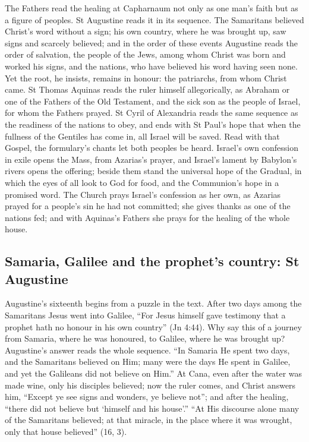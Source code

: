 \label{sec:israel-and-the-nations}

The Fathers read the healing at Capharnaum not only as one man's faith but as
a figure of peoples. St Augustine reads it in its sequence. The Samaritans
believed Christ's word without a sign; his own country, where he was brought up,
saw signs and scarcely believed; and in the order of these events Augustine
reads the order of salvation, the people of the Jews, among whom Christ was born
and worked his signs, and the nations, who have believed his word having seen
none. Yet the root, he insists, remains in honour: the patriarchs, from whom
Christ came. St Thomas Aquinas reads the ruler himself allegorically, as
Abraham or one of the Fathers of the Old Testament, and the sick son as the
people of Israel, for whom the Fathers prayed. St Cyril of Alexandria reads the
same sequence as the readiness of the nations to obey, and ends with St Paul's
hope that when the fullness of the Gentiles has come in, all Israel will be
saved. Read with that Gospel, the formulary's chants let both peoples be heard.
Israel's own confession in exile opens the Mass, from Azarias's prayer, and
Israel's lament by Babylon's rivers opens the offering; beside them stand the
universal hope of the Gradual, in which the eyes of all look to God for food,
and the Communion's hope in a promised word. The Church prays Israel's
confession as her own, as Azarias prayed for a people's sin he had not
committed; she gives thanks as one of the nations fed; and with Aquinas's
Fathers she prays for the healing of the whole house.

\subsection{Samaria, Galilee and the prophet's country: St Augustine}

Augustine's sixteenth  begins from a puzzle in the text.
After two days among the Samaritans Jesus went into Galilee, ``For Jesus himself
gave testimony that a prophet hath no honour in his own country'' (Jn 4:44).
Why say this of a journey from Samaria, where he was honoured, to Galilee, where
he was brought up? Augustine's answer reads the whole sequence. ``In Samaria He
spent two days, and the Samaritans believed on Him; many were the days He spent
in Galilee, and yet the Galileans did not believe on Him.'' At Cana, even after
the water was made wine, only his disciples believed; now the ruler comes, and
Christ answers him, ``Except ye see signs and wonders, ye believe not''; and
after the healing, ``there did not believe but `himself and his house'.'' ``At
His discourse alone many of the Samaritans believed; at that miracle, in the
place where it was wrought, only that house believed'' (16, 3).

